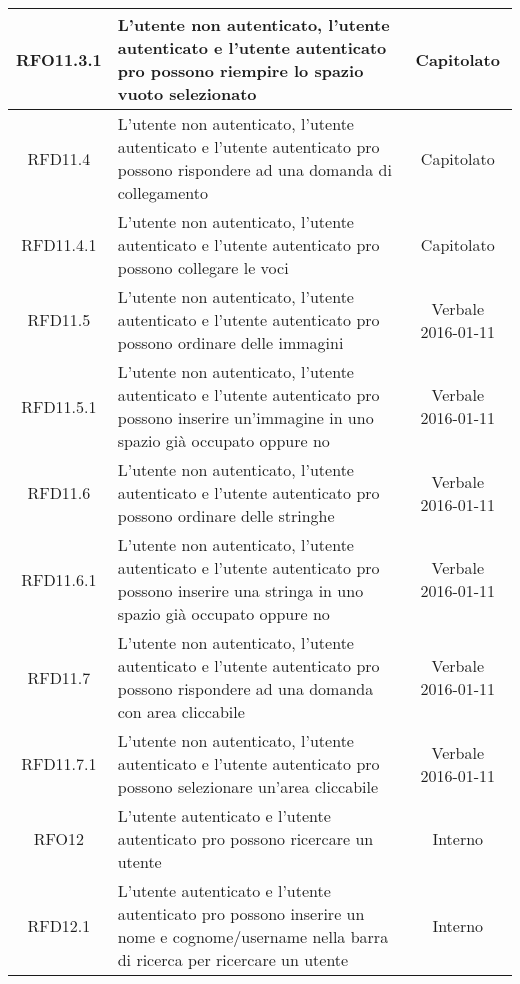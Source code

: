 \begin{longtable}{|c|>{\centering}m{7cm}|c|}
\hypertarget{RFO11.3.1}{RFO11.3.1} & L’utente non autenticato, l’utente autenticato e l’utente autenticato pro possono riempire lo spazio vuoto selezionato & Capitolato
\\ \hline

\hypertarget{RFD11.4}{RFD11.4} & L’utente non autenticato, l’utente autenticato e l’utente autenticato pro possono rispondere ad una domanda di collegamento & Capitolato
\\ \hline

\hypertarget{RFD11.4.1}{RFD11.4.1} & L’utente non autenticato, l’utente autenticato e l’utente autenticato pro possono collegare le voci & Capitolato
\\ \hline

\hypertarget{RFD11.5}{RFD11.5} & L’utente non autenticato, l’utente autenticato e l’utente autenticato pro possono ordinare delle immagini & Verbale 2016-01-11
\\ \hline

\hypertarget{RFD11.5.1}{RFD11.5.1} & L’utente non autenticato, l’utente autenticato e l’utente autenticato pro possono inserire un’immagine in uno spazio già occupato oppure no & Verbale 2016-01-11
\\ \hline

\hypertarget{RFD11.6}{RFD11.6} & L’utente non autenticato, l’utente autenticato e l’utente autenticato pro possono ordinare delle stringhe & Verbale 2016-01-11
\\ \hline

\hypertarget{RFD11.6.1}{RFD11.6.1} & L’utente non autenticato, l’utente autenticato e l’utente autenticato pro possono inserire una stringa in uno spazio già occupato oppure no & Verbale 2016-01-11
\\ \hline

\hypertarget{RFD11.7}{RFD11.7} & L’utente non autenticato, l’utente autenticato e l’utente autenticato pro possono rispondere ad una domanda con area cliccabile & Verbale 2016-01-11
\\ \hline

\hypertarget{RFD11.7.1}{RFD11.7.1} & L’utente non autenticato, l’utente autenticato e l’utente autenticato pro possono selezionare un’area cliccabile & Verbale 2016-01-11
\\ \hline

\hypertarget{RFO12}{RFO12} & L’utente autenticato e l’utente autenticato pro possono ricercare un utente & Interno
\\ \hline

\hypertarget{RFD12.1}{RFD12.1} & L’utente autenticato e l’utente autenticato pro possono inserire un nome e cognome/username nella barra di ricerca per ricercare un utente & Interno
\\ \hline


\end{longtable}
